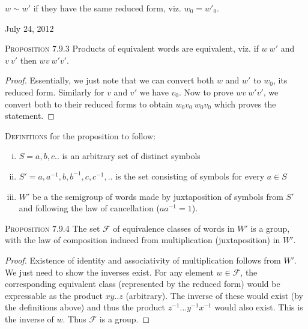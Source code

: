 \documentclass[12pt]{article}
\begin{document}
$w \sim w'$ if they have the same reduced form, viz. $w_{0}=w'_{0}$.
\begin{flushright} {\small July 24, 2012} \end{flushright}
\textsc {Proposition 7.9.3} Products of equivalent words are equivalent, viz. if $w~w'$ and $v~v'$ then $wv~w'v'$.
\begin{proof}
Essentially, we just note that we can convert both $w$ and $w'$ to $w_{0}$, its reduced form. Similarly for $v$ and $v'$ we have $v_{0}$. Now to prove $wv~w'v'$, we convert both to their reduced forms to obtain $w_{0}v_{0}~w_{0}v_{0}$ which proves the statement.
\end{proof}
\textsc {Definitions} for the proposition to follow:
\begin{enumerate}[(i)]
\item $S = {a,b,c..}$ is an arbitrary set of distinct symbols
\item $S' = {a,a^{-1},b,b^{-1},c,c^{-1},..}$ is the set consisting of symbols for every $a \in S$
\item $W'$ be a the semigroup of words made by juxtaposition of symbols from $S'$ and following the law of cancellation ($aa^{-1}=1$).
\end{enumerate}

\textsc {Proposition 7.9.4} The set $\mathcal F$ of equivalence classes of words in $W'$ is a group, with the law of composition induced from multiplication (juxtaposition) in $W'$.
\begin{proof}
Existence of identity and associativity of multiplication follows from $W'$. We just need to show the inverses exist. For any element $w \in \mathcal F$, the corresponding equivalent class (represented by the reduced form) would be expressable as the product $xy..z$ (arbitrary). The inverse of these would exist (by the definitions above) and thus the product $z^{-1}...y^{-1}x^{-1}$ would also exist. This is the inverse of $w$. Thus $\mathcal F$ is a group.
\end{proof}
\end{document}
